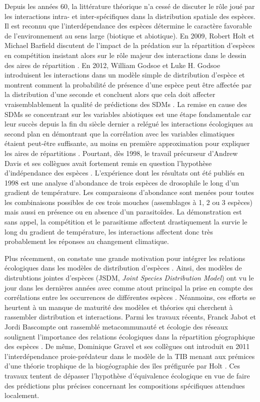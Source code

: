 Depuis les années 60, la littérature théorique n'a cessé de discuter le
rôle joué par les interactions intra- et inter-spécifiques dans la
distribution spatiale des espèces. Il est reconnu que l'interdépendance
des espèces détermine le caractère favorable de l'environnement au sens
large (biotique et abiotique). En 2009, Robert Holt et Michael Barfield
discutent de l'impact de la prédation sur la répartition d'espèces en
compétition insistant alors sur le rôle majeur des interactions dans le
dessin des aires de répartition \citep{Holt2009}. En 2012, William
Godsoe et Luke H. Godsoe introduisent les interactions dans un modèle
simple de distribution d'espèce et montrent comment la probabilité de
présence d'une espèce peut être affectée par la distribution d'une
seconde et concluent alors que cela doit affecter vraisemblablement la
qualité de prédictions des SDMs \citep{Godsoe2012}. La remise en cause
des SDMs se concentrant sur les variables abiotiques est une étape
fondamentale car leur succès depuis la fin du siècle dernier a relégué
les interactions écologiques au second plan en démontrant que la
corrélation avec les variables climatiques étaient peut-être suffisante,
au moins en première approximation pour expliquer les aires de
répartitions \citep{Pearson2003}. Pourtant, dès 1998, le travail
précurseur d'Andrew Davis et ses collègues \citep{Davis1998} avait
fortement remis en question l'hypothèse d'indépendance des espèces
\citep{Jeschke2008}. L'expérience dont les résultats ont été publiés en
1998 est une analyse d'abondance de trois espèces de drosophile le long
d'un gradient de température. Les comparaisons d'abondance sont menées
pour toutes les combinaisons possibles de ces trois mouches (assemblages
à 1, 2 ou 3 espèces) mais aussi en présence ou en absence d'un
parasitoïdes. La démonstration est sans appel, la compétition et le
parasitisme affectent drastiquement la survie le long du gradient de
température, les interactions affectent donc très probablement les
réponses au changement climatique.

Plus récemment, on constate une grande motivation pour intégrer les
relations écologiques dans les modèles de distribution d'espèces
\citep{Kissling2012, Guisan2011}. Ainsi, des modèles de distrubtions
jointes d'espèces (JSDM, \emph{Joint Species Distribution Model}) ont vu
le jour dans les dernières années avec comme atout principal la prise en
compte des corrélations entre les occurrences de différentes espèces
\citep{Pollock2014, Ovaskainen2010}. Néanmoins, ces efforts se heurtent
à un manque de maturité des modèles et théories qui cherchent à
rassembler distribution et interactions. Parmi les travaux récents,
Franck Jabot et Jordi Bascompte ont rassemblé metacommunauté et écologie
des réseaux soulignent l'importance des relations écologiques dans la
répartition géographique des espèces \citep{Jabot2012}. De même,
Dominique Gravel et ses collègues ont introduit en 2011
l'interdépendance proie-prédateur dans le modèle de la TIB menant aux
prémices d'une théorie trophique de la biogéographie des îles
\citep{Gravel2011} préfigurée par Holt \citep{Holt2009a}. Ces travaux
tentent de dépasser l'hypothèse d'équivalence écologique en vue de faire
des prédictions plus précises concernant les compositions spécifiques
attendues localement.

